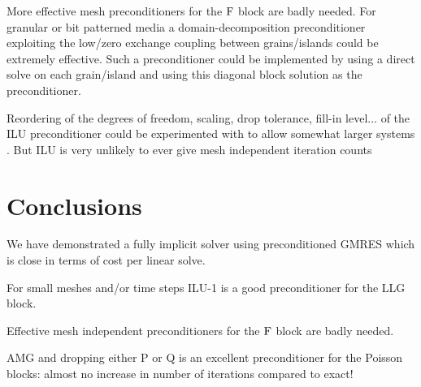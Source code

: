 More effective mesh preconditioners for the $\mathrm{F}$ block are badly needed.
For granular or bit patterned media a domain-decomposition preconditioner exploiting the low/zero exchange coupling between grains/islands could be extremely effective.
Such a preconditioner could be implemented by using a direct solve on each grain/island and using this diagonal block solution as the preconditioner.

Reordering of the degrees of freedom, scaling, drop tolerance, fill-in level... of the ILU preconditioner could be experimented with to allow somewhat larger systems \cite[287]{Saad2000}.
But ILU is very unlikely to ever give mesh independent iteration counts


\section{Conclusions}

We have demonstrated a fully implicit solver using preconditioned GMRES which is close in terms of cost per linear solve.

For small meshes and/or time steps ILU-1 is a good preconditioner for the LLG block.

Effective mesh independent preconditioners for the $\mathrm{F}$ block are badly needed.

AMG and dropping either P or Q is an excellent preconditioner for the Poisson blocks: almost no increase in number of iterations compared to exact!



